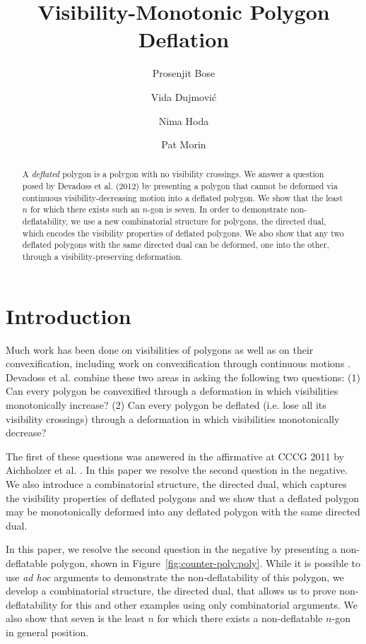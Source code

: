 \documentclass{amsart}
\title{Visibility-Monotonic Polygon Deflation}%
\author{Prosenjit Bose\and Vida Dujmovi{\'c}\and Nima Hoda\and Pat
  Morin}
\begin{document}
\ifconferenceversion
\thispagestyle{empty}
\fi

\maketitle

\begin{abstract}
  A \emph{deflated} polygon is a polygon with no visibility crossings.
  We answer a question posed by Devadoss et al. (2012) by presenting a
  polygon that cannot be deformed via continuous visibility-decreasing
  motion into a deflated polygon.  \iffullversion We show that the
  least $n$ for which there exists such an $n$-gon is seven.  \fi In
  order to demonstrate non-deflatability, we use a new combinatorial
  structure for polygons, the directed dual, which encodes the
  visibility properties of deflated polygons.  We also show that any
  two deflated polygons with the same directed dual can be deformed,
  one into the other, through a visibility-preserving deformation.
\end{abstract}

\section{Introduction}

Much work has been done on visibilities of polygons \cite{Ghosh07,
  ORourke87} as well as on their convexification, including work on
convexification through continuous motions \cite{Connely00}.  Devadoss
et al. \cite{Devadoss09} combine these two areas in asking the
following two questions: (1) Can every polygon be convexified through
a deformation in which visibilities monotonically increase?  (2) Can
every polygon be deflated (i.e. lose all its visibility crossings)
through a deformation in which visibilities monotonically decrease?

The first of these questions was answered in the affirmative at CCCG
2011 by Aichholzer et al. \cite{Aichholzer11b}.
%
\ifconferenceversion
%
In this paper we resolve the second question in the negative.  We also
introduce a combinatorial structure, the directed dual, which captures
the visibility properties of deflated polygons and we show that a
deflated polygon may be monotonically deformed into any deflated
polygon with the same directed dual.

\else %
%
In this paper, we resolve the second question in the negative by
presenting a non-deflatable polygon, shown in
Figure~\ref{fig:counter-poly:poly}.  While it is possible to use
\textit{ad hoc} arguments to demonstrate the non-deflatability of this
polygon, we develop a combinatorial structure, the directed dual, that
allows us to prove non-deflatability for this and other examples using
only combinatorial arguments.  We also show that seven is the least
$n$ for which there exists a non-deflatable $n$-gon in general
position.
\end{document}
